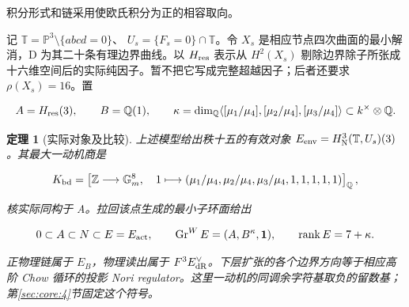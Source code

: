 \documentclass[11pt,a4paper,oneside]{ctexrep}
\theoremstyle{cnplain}
\newtheorem{theorem}{定理}[chapter]
\theoremstyle{definition}
\theoremstyle{remark}
\begin{document}
积分形式和链采用使欧氏积分为正的相容取向。

记 \(\mathbb T=\mathbb P^3\setminus\{abcd=0\}\)、 \(U_s=\{F_s=0\}\cap\mathbb T\)。令 \(X_s\) 是相应节点四次曲面的最小解消，D 为其二十条有理边界曲线。以 \(H_{\rm res}\) 表示从 \(H^2(X_s)\) 剔除边界除子所张成十六维空间后的实际纯因子。暂不把它写成完整超越因子；后者还要求 \(\rho(X_s)=16\)。置

\begin{equation}
A=H_{\rm res}(3),\qquad B=\mathbb Q(1),\qquad
 \kappa=\dim_{\mathbb Q}\langle[\mu_1/\mu_4],
 [\mu_2/\mu_4],[\mu_3/\mu_4]\rangle\subset k^\times\otimes\mathbb Q.
                                                               \label{eq:core:1.3}
\end{equation}

\begin{theorem}[实际对象及比较]

\label{thm:core:A} 上述模型给出秩十五的有效对象 \(E_{\rm env}=H^3_{\rm N}(\mathbb T,U_s)(3)\)。其最大一动机商是

\begin{equation}
K_{\rm bd}=\left[\mathbb Z\longrightarrow\mathbb G_m^8,\quad
 1\longmapsto(\mu_1/\mu_4,\mu_2/\mu_4,\mu_3/\mu_4,1,1,1,1,1)\right]_{\mathbb Q},
                                                               \label{eq:core:1.4}
\end{equation}

核实际同构于 A。拉回该点生成的最小子环面给出

\begin{equation}
0\subset A\subset N\subset E=E_{\rm act},\qquad
 \operatorname{Gr}^W E=(A,B^\kappa,\mathbf1),\qquad
 \operatorname{rank}E=7+\kappa.                           \label{eq:core:1.5}
\end{equation}

正物理链属于 \(E_B\)，物理读出属于 \(F^3E_{\rm dR}^{\vee}\)。下层扩张的各个边界方向等于相应高阶 Chow 循环的投影 Nori regulator。这里一动机的同调余字符基取负的留数基；第\ref{sec:core:4}节固定这个符号。

\end{theorem}
\end{document}
